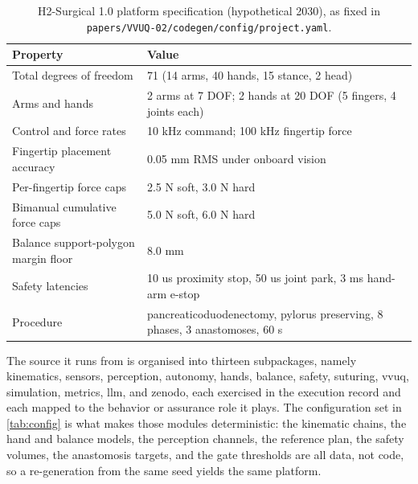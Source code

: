 \begin{table}[H]
\caption{H2-Surgical 1.0 platform specification (hypothetical 2030), as fixed in
\texttt{papers/VVUQ-02/codegen/config/project.yaml}.}
\label{tab:platform}
\centering
\footnotesize
\begin{tabularx}{\textwidth}{L{5.2cm} Y}
\toprule
\textbf{Property} & \textbf{Value} \\
\midrule
Total degrees of freedom & 71 (14 arms, 40 hands, 15 stance, 2 head) \\
Arms and hands & 2 arms at 7 DOF; 2 hands at 20 DOF (5 fingers, 4 joints each) \\
Control and force rates & 10 kHz command; 100 kHz fingertip force \\
Fingertip placement accuracy & 0.05 mm RMS under onboard vision \\
Per-fingertip force caps & 2.5 N soft, 3.0 N hard \\
Bimanual cumulative force caps & 5.0 N soft, 6.0 N hard \\
Balance support-polygon margin floor & 8.0 mm \\
Safety latencies & 10 us proximity stop, 50 us joint park, 3 ms hand-arm e-stop \\
Procedure & pancreaticoduodenectomy, pylorus preserving, 8 phases, 3 anastomoses, 60 s \\
\bottomrule
\end{tabularx}
\end{table}

The source it runs from is organised into thirteen subpackages, namely
kinematics, sensors, perception, autonomy, hands, balance, safety, suturing,
vvuq, simulation, metrics, llm, and zenodo, each exercised in the execution
record and each mapped to the behavior or assurance role it plays. The
configuration set in \autoref{tab:config} is what makes those modules
deterministic: the kinematic chains, the hand and balance models, the perception
channels, the reference plan, the safety volumes, the anastomosis targets, and
the gate thresholds are all data, not code, so a re-generation from the same seed
yields the same platform.

